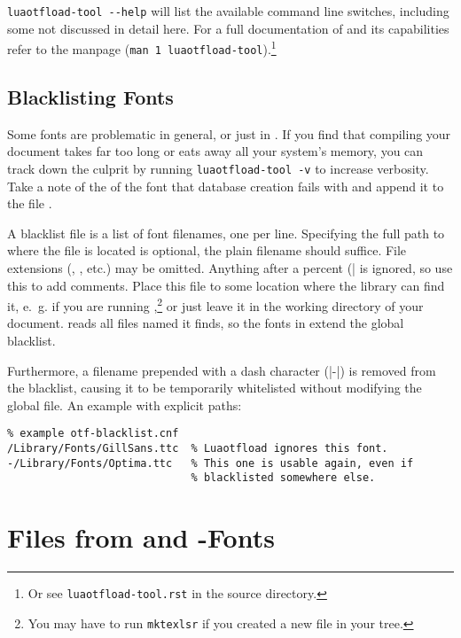\verb|luaotfload-tool --help| will list the available command line
switches, including some not discussed in detail here.
%
For a full documentation of  and its
capabilities refer to the manpage
(\verb|man 1 luaotfload-tool|).\footnote{%
  Or see \verb|luaotfload-tool.rst| in the source directory.
}

\subsection{Blacklisting Fonts}
\label{font-blacklist}

Some fonts are problematic in general, or just in \LUATEX.
%
If you find that compiling your document takes far too long or eats
away all your system’s memory, you can track down the culprit by
running \verb|luaotfload-tool -v| to increase verbosity.
%
Take a note of the  of the font that database
creation fails with and append it to the file
.

A blacklist file is a list of font filenames, one per line.
Specifying the full path to where the file is located is optional, the
plain filename should suffice.
%
File extensions (, , etc.) may be omitted.
%
Anything after a percent (|%
is ignored, so use this to add comments.
%
Place this file to some location where the 
library can find it, e.~g.
 if you are running
,\footnote{%
  You may have to run \verb|mktexlsr| if you created a new file in
  your  tree.
}
or just leave it in the working directory of your document.
%
 reads all files named
 it finds, so the fonts in
 extend the global blacklist.

Furthermore, a filename prepended with a dash character (|-|) is
removed from the blacklist, causing it to be temporarily whitelisted
without modifying the global file.
%
An example with explicit paths:

\begin{verbatim}
% example otf-blacklist.cnf
/Library/Fonts/GillSans.ttc  % Luaotfload ignores this font.
-/Library/Fonts/Optima.ttc   % This one is usable again, even if
                             % blacklisted somewhere else.
\end{verbatim}

\section{Files from \CONTEXT and \LUATEX-Fonts}

